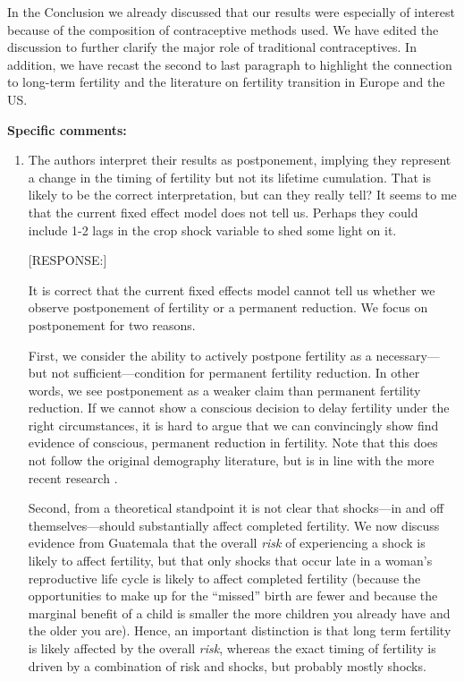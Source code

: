\documentclass[letterpaper,12pt]{article}
\begin{document}
In the Conclusion we already discussed that our results were
especially of interest because of the composition of contraceptive
methods used.
We have edited the discussion to further clarify the major role
of traditional contraceptives.
In addition, we have recast the second to last paragraph to
highlight the connection to long-term fertility and the literature
on fertility transition in Europe and the US.



\noindent \textbf{Specific comments:}

\begin{enumerate}

\item The authors interpret their results as postponement, implying they
represent a change in the timing of fertility but not its lifetime
cumulation. That is likely to be the correct interpretation, but can
they really tell? It seems to me that the current fixed effect model
does not tell us. Perhaps they could include 1-2 lags in the crop shock
variable to shed some light on it.

[RESPONSE:]

It is correct that the current fixed effects model cannot tell
us whether we observe postponement of fertility or a permanent reduction.
We focus on postponement for two reasons.

First, we consider the ability to actively postpone fertility as a 
necessary---but not sufficient---condition for permanent fertility reduction.
In other words, we see postponement as a weaker claim than permanent 
fertility reduction.
If we cannot show a conscious decision to delay fertility under the
right circumstances, it is hard to argue that we can convincingly
show find evidence of conscious, permanent reduction in fertility.
Note that this does not follow the original demography
literature, but is in line with the more recent research
\citep[See discussion in][]{Cinnirella2017}.

Second, from a theoretical standpoint it is not clear that 
shocks---in and off themselves---should substantially affect completed 
fertility. 
We now discuss evidence from Guatemala that the overall \emph{risk} of 
experiencing a shock is likely to affect fertility, but that only
shocks that occur late in a woman's reproductive life cycle is
likely to affect completed fertility (because the opportunities to
make up for the ``missed'' birth are fewer and because the marginal
benefit of a child is smaller the more children you already have and
the older you are).
Hence, an important distinction is that long term fertility is likely
affected by the overall \emph{risk}, whereas the exact timing of
fertility is driven by a combination of risk and shocks, but probably
mostly shocks.


\end{enumerate}
\end{document}
